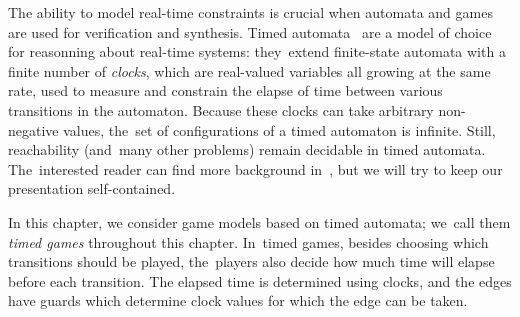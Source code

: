 
%



The ability to model real-time constraints is crucial when automata
and games are used for verification and synthesis. Timed
automata~\cite{AD94} are a model of choice for reasonning about
real-time systems: they~extend finite-state automata with a
finite number of \emph{clocks}, which are real-valued variables all
growing at the same rate, used to measure and constrain the elapse of
time between various transitions in the automaton. Because these
clocks can take arbitrary non-negative values, the~set of
configurations of a timed automaton is infinite. Still, reachability
(and~many other problems) remain decidable in timed
automata. The~interested reader can find more background
in~\cite{AD94}, but we will try to keep our presentation self-contained.

In this chapter, we consider game models based on timed automata;
we~call them \emph{timed games} throughout this chapter. In~timed
games, besides choosing which transitions should be played,
the~players also decide how much time will elapse before each
transition. The elapsed time is determined using clocks, and the edges have
guards which determine clock values for which the edge can be taken.










